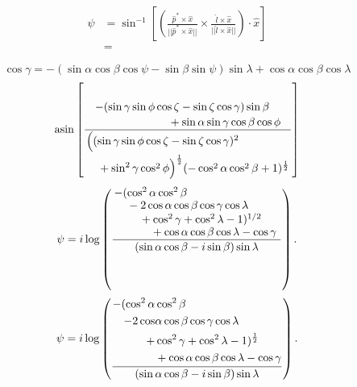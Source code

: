 \documentclass[a4paper,onecolumn,11pt]{article}
\begin{document}
\begin{align}
    \psi &= \sin^{-1} 
    \left[ 
        \left(
           \frac{ \hat p^* \times \hat x }{ || \hat p^* \times \hat x || }
           \times
           \frac{ \hat l \times \hat x }{ || \hat l \times \hat x || }
        \right)
        \cdot \hat x
    \right]\\
    &=
\end{align}

\begin{equation}
\cos{\gamma} = - (\sin{\alpha} \cos{\beta } \cos{\psi} - \sin{\beta} \sin{\psi}) \sin{\lambda} + \cos{\alpha} \cos{\beta} \cos{\lambda}
\end{equation}
\begin{equation}
    \operatorname{asin}{\left[
        \frac{
            \splitdfrac{
                - (\sin{\gamma} \sin{\phi} \cos{\zeta} 
                - \sin{\zeta} \cos{\gamma}) \sin{\beta}
            }
            {
                + \sin{\alpha} \sin{\gamma} \cos{\beta} \cos{\phi }
            }
        }
        {
            \splitdfrac{
                \Big((\sin{\gamma} \sin{\phi} \cos{\zeta} 
                - \sin{\zeta} \cos{\gamma})^{2} 
            }
            {
                + \sin^{2}{\gamma} \cos^{2}{\phi}\Big)^{\frac{1}{2}}
                (- \cos^{2}{\alpha} \cos^{2}{\beta} 
                + 1)^{\frac{1}{2}}
            }
        } 
    \right]}
\end{equation}
\begin{equation}
    \psi = i \log\left(
        \frac{
            \splitfrac{
                -(\cos^{2}{\alpha } \cos^{2}{\beta } 
            }
            {
                \splitfrac{\mathstrut
                    - 2 \cos{\alpha } \cos{\beta } 
                    \cos{\gamma } \cos{\lambda }
                }
                {
                    \splitfrac{\mathstrut
                        + \cos^{2}{\gamma } 
                        + \cos^{2}{\lambda } - 1)^{1/2} 
                    }
                    {
                                + \cos{\alpha } \cos{\beta } \cos{\lambda } 
                                - \cos{\gamma }
                    }
                }
            }
        }
        {
            (\sin{\alpha } \cos{\beta } - i \sin{\beta }) \sin{\lambda }
        }
    \right).
\end{equation}
\begin{equation}
    \psi = i \log\left(
        \vcenter{\hbox{$\displaystyle
        \frac{
            \begin{aligned}
                -(\cos^{2}{\alpha } &\cos^{2}{\beta } \\
                - 2 \cos&{\alpha } \cos{\beta } \cos{\gamma } \cos{\lambda } \\
                + &\cos^{2}{\gamma } + \cos^{2}{\lambda } - 1)^{\frac{1}{2}} \\
                &+ \cos{\alpha } \cos{\beta } \cos{\lambda } - \cos{\gamma }
            \end{aligned}
        }
        {
            (\sin{\alpha } \cos{\beta } - i \sin{\beta }) \sin{\lambda }
        }$}}
    \right).
\end{equation}
\end{document}
